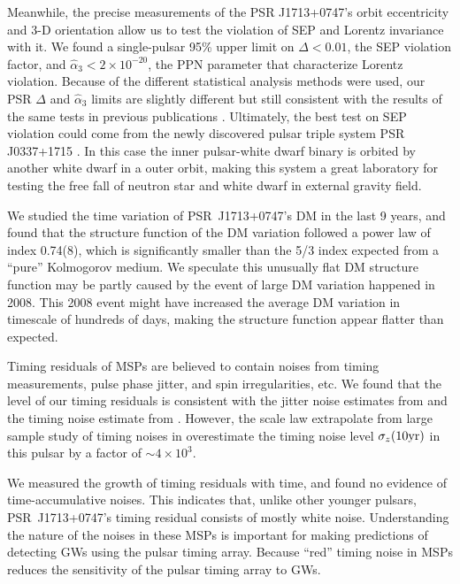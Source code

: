 
Meanwhile, the precise measurements of the PSR J1713+0747's orbit eccentricity and
3-D orientation allow us to test the violation of SEP and 
Lorentz invariance with it. We found a single-pulsar 95\% upper limit on 
$\Delta <0.01$, the SEP violation factor, and
$\hat{\alpha}_3<2\times10^{-20}$, the PPN parameter that characterize Lorentz
violation. 
Because of the different statistical analysis methods were used, our PSR
$\Delta$ and $\hat{\alpha}_3$ limits  are slightly
different but still consistent with the results of the same tests in previous publications 
\citep{wex00, sns+05, sfl+05, gsf+11}.
Ultimately, the best test on SEP violation could come from the newly
discovered pulsar triple system PSR J0337+1715 \citep{rsa+14}. In this case 
the inner pulsar-white dwarf binary is orbited by another white dwarf in a
outer orbit, making this system a great laboratory for testing
the free fall of neutron star and white dwarf in external gravity field.

{\bfref 
We studied the time variation of PSR~J1713+0747's DM in the last 9 years, and found that 
the structure function of the DM variation followed a power law of 
index 0.74(8), which is significantly smaller than the 5/3 index expected from a ``pure''
Kolmogorov medium. We speculate this unusually flat DM structure function may
be partly caused by the event of large DM variation happened in 2008. This
2008 event might have increased the average DM variation in timescale of
hundreds of days, making the structure function appear flatter than expected.

Timing residuals of MSPs are believed to contain noises from timing
measurements, pulse phase jitter, and spin irregularities, etc. 
We found that the level of our timing residuals is consistent with the jitter
noise estimates from \citet{sc12} and the timing noise estimate from \citet{sc10}. However,
the scale law extrapolate from large sample study of timing noises in \citet{hlk10}
overestimate the timing noise level $\sigma_z({\rm 10 yr})$ in this pulsar by
a factor of $\sim4\times10^3$.

We measured the growth of timing residuals with time, and found no evidence of
time-accumulative noises. This indicates that, unlike other younger pulsars,
PSR~J1713+0747's timing residual consists of mostly white noise. Understanding the nature 
of the noises in these MSPs is important for making predictions of detecting
GWs using the pulsar timing array. Because ``red'' timing noise in MSPs reduces
the sensitivity of the pulsar timing array to GWs.
}

